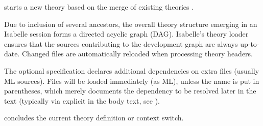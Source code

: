 \begin{isabellebody}
\begin{isamarkuptext}
\begin{descr}
  \item [\mbox{\isa{\isacommand{theory}}}~\isa{{\isachardoublequote}A\ {\isasymIMPORTS}\ B\isactrlsub {\isadigit{1}}\ {\isasymdots}\ B\isactrlsub n\ {\isasymBEGIN}{\isachardoublequote}}] starts a new theory  based on the
  merge of existing theories .
  
  Due to inclusion of several ancestors, the overall theory structure
  emerging in an Isabelle session forms a directed acyclic graph
  (DAG).  Isabelle's theory loader ensures that the sources
  contributing to the development graph are always up-to-date.
  Changed files are automatically reloaded when processing theory
  headers.
  
  The optional \mbox{} specification declares additional
  dependencies on extra files (usually ML sources).  Files will be
  loaded immediately (as ML), unless the name is put in parentheses,
  which merely documents the dependency to be resolved later in the
  text (typically via explicit \mbox{} in the body text,
  see ).
  
  \item [\mbox{\isa{\isacommand{end}}}] concludes the current theory definition or
  context switch.

  \end{descr}%
\end{isamarkuptext}%
\isamarkuptrue%
%
\isadelimtheory
%
\endisadelimtheory
%
\isatagtheory
{}\isamarkupfalse%
%
\endisatagtheory
{\isafoldtheory}%
%
\isadelimtheory
%
\endisadelimtheory
\isanewline
\end{isabellebody}%
